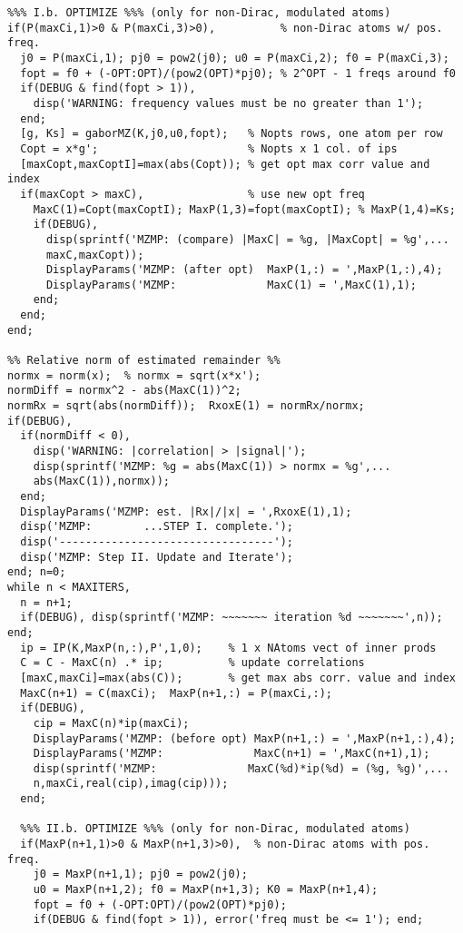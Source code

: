 \begin{verbatim}
%%% I.b. OPTIMIZE %%% (only for non-Dirac, modulated atoms)
if(P(maxCi,1)>0 & P(maxCi,3)>0),          % non-Dirac atoms w/ pos. freq.
  j0 = P(maxCi,1); pj0 = pow2(j0); u0 = P(maxCi,2); f0 = P(maxCi,3);
  fopt = f0 + (-OPT:OPT)/(pow2(OPT)*pj0); % 2^OPT - 1 freqs around f0
  if(DEBUG & find(fopt > 1)),
    disp('WARNING: frequency values must be no greater than 1');
  end;
  [g, Ks] = gaborMZ(K,j0,u0,fopt);   % Nopts rows, one atom per row
  Copt = x*g';                       % Nopts x 1 col. of ips
  [maxCopt,maxCoptI]=max(abs(Copt)); % get opt max corr value and index
  if(maxCopt > maxC),                % use new opt freq 
    MaxC(1)=Copt(maxCoptI); MaxP(1,3)=fopt(maxCoptI); % MaxP(1,4)=Ks;
    if(DEBUG),
      disp(sprintf('MZMP: (compare) |MaxC| = %g, |MaxCopt| = %g',...
	  maxC,maxCopt));
      DisplayParams('MZMP: (after opt)  MaxP(1,:) = ',MaxP(1,:),4);
      DisplayParams('MZMP:              MaxC(1) = ',MaxC(1),1);
    end;
  end;
end;

%% Relative norm of estimated remainder %%
normx = norm(x);  % normx = sqrt(x*x');
normDiff = normx^2 - abs(MaxC(1))^2;
normRx = sqrt(abs(normDiff));  RxoxE(1) = normRx/normx;
if(DEBUG),
  if(normDiff < 0),  
    disp('WARNING: |correlation| > |signal|');
    disp(sprintf('MZMP: %g = abs(MaxC(1)) > normx = %g',...
	abs(MaxC(1)),normx)); 
  end;
  DisplayParams('MZMP: est. |Rx|/|x| = ',RxoxE(1),1);
  disp('MZMP:        ...STEP I. complete.');
  disp('---------------------------------');
  disp('MZMP: Step II. Update and Iterate');
end; n=0; 
while n < MAXITERS,
  n = n+1;
  if(DEBUG), disp(sprintf('MZMP: ~~~~~~~ iteration %d ~~~~~~~',n)); end;
  ip = IP(K,MaxP(n,:),P',1,0);    % 1 x NAtoms vect of inner prods
  C = C - MaxC(n) .* ip;          % update correlations
  [maxC,maxCi]=max(abs(C));       % get max abs corr. value and index
  MaxC(n+1) = C(maxCi);  MaxP(n+1,:) = P(maxCi,:);
  if(DEBUG), 
    cip = MaxC(n)*ip(maxCi);
    DisplayParams('MZMP: (before opt) MaxP(n+1,:) = ',MaxP(n+1,:),4);
    DisplayParams('MZMP:              MaxC(n+1) = ',MaxC(n+1),1);
    disp(sprintf('MZMP:              MaxC(%d)*ip(%d) = (%g, %g)',...
	n,maxCi,real(cip),imag(cip)));
  end;

  %%% II.b. OPTIMIZE %%% (only for non-Dirac, modulated atoms)
  if(MaxP(n+1,1)>0 & MaxP(n+1,3)>0),  % non-Dirac atoms with pos. freq.
    j0 = MaxP(n+1,1); pj0 = pow2(j0);  
    u0 = MaxP(n+1,2); f0 = MaxP(n+1,3); K0 = MaxP(n+1,4);
    fopt = f0 + (-OPT:OPT)/(pow2(OPT)*pj0);
    if(DEBUG & find(fopt > 1)), error('freq must be <= 1'); end;


\end{verbatim}
